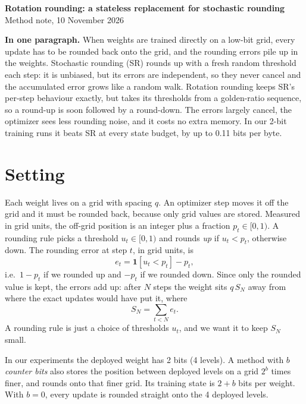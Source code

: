 \documentclass[11pt,letterpaper]{article}
\theoremstyle{definition}
\newcommand{\1}{\mathbf{1}}
\begin{document}
\begin{center}
{\Large\bfseries Rotation rounding: a stateless replacement for stochastic rounding}\\[4pt]
{\small Method note, 10 November 2026}
\end{center}

\textbf{In one paragraph.} When weights are trained directly on a low-bit grid, every update has to be rounded back
onto the grid, and the rounding errors pile up in the weights. Stochastic rounding (SR) rounds up with a fresh random
threshold each step: it is unbiased, but its errors are independent, so they never cancel and the accumulated error
grows like a random walk. Rotation rounding keeps SR's per-step behaviour exactly, but takes its thresholds from a
golden-ratio sequence, so a round-up is soon followed by a round-down. The errors largely cancel, the optimizer sees
less rounding noise, and it costs no extra memory. In our 2-bit training runs it beats SR at every state budget, by
up to 0.11 bits per byte.

\section{Setting}
Each weight lives on a grid with spacing $q$. An optimizer step moves it off the grid and it must be rounded back,
because only grid values are stored. Measured in grid units, the off-grid position is an integer plus a fraction
$p_t\in[0,1)$. A rounding rule picks a threshold $u_t\in[0,1)$ and rounds \emph{up} if $u_t<p_t$, otherwise down.
The rounding error at step $t$, in grid units, is
\begin{equation}
e_t=\1[u_t<p_t]-p_t ,
\end{equation}
i.e.\ $1-p_t$ if we rounded up and $-p_t$ if we rounded down. Since only the rounded value is kept, the errors add
up: after $N$ steps the weight sits $q\,S_N$ away from where the exact updates would have put it, where
\[
S_N=\textstyle\sum_{t<N}e_t .
\]
A rounding rule is just a choice of thresholds $u_t$, and we want it to keep $S_N$ small.

In our experiments the deployed weight has 2 bits (4 levels). A method with $b$ \emph{counter bits} also stores the
position between deployed levels on a grid $2^b$ times finer, and rounds onto that finer grid. Its training state is
$2+b$ bits per weight. With $b=0$, every update is rounded straight onto the 4 deployed levels.
\end{document}
